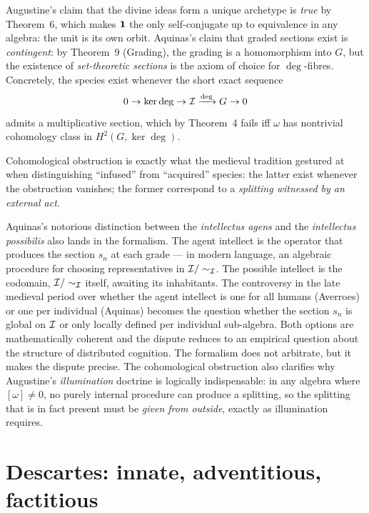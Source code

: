 \formalstatus Augustine's claim that the divine ideas form a unique
archetype is \emph{true} by Theorem~6, which makes $\mathbf{1}$ the only
self-conjugate up to equivalence in any algebra: the unit is its own
orbit. Aquinas's claim that graded sections exist is \emph{contingent}:
by Theorem~9 (Grading), the grading is a homomorphism into $G$, but the
existence of \emph{set-theoretic sections} is the axiom of choice for
$\deg$-fibres. Concretely, the species exist whenever the short exact
sequence
\[
  0 \to \ker\deg \to \mathcal{I} \xrightarrow{\deg} G \to 0
\]
admits a multiplicative section, which by Theorem~4 fails iff
$\omega$ has nontrivial cohomology class in $H^2(G,\ker\deg)$.

\litcomment Cohomological obstruction is exactly what the medieval
tradition gestured at when distinguishing ``infused'' from ``acquired''
species: the latter exist whenever the obstruction vanishes; the former
correspond to a \emph{splitting witnessed by an external act}.

Aquinas's notorious distinction between the \emph{intellectus agens}
and the \emph{intellectus possibilis} also lands in the formalism. The
agent intellect is the operator that produces the section $s_n$ at each
grade --- in modern language, an algebraic procedure for choosing
representatives in $\mathcal{I}/\sim_{\mathcal{I}}$. The possible intellect is the
codomain, $\mathcal{I}/\sim_{\mathcal{I}}$ itself, awaiting its inhabitants. The
controversy in the late medieval period over whether the agent
intellect is one for all humans (Averroes) or one per individual
(Aquinas) becomes the question whether the section $s_n$ is global on
$\mathcal{I}$ or only locally defined per individual sub-algebra. Both
options are mathematically coherent and the dispute reduces to an
empirical question about the structure of distributed cognition. The
formalism does not arbitrate, but it makes the dispute precise. The
cohomological obstruction also clarifies why Augustine's
\emph{illumination} doctrine is logically indispensable: in any algebra
where $[\omega]\neq 0$, no purely internal procedure can produce a
splitting, so the splitting that is in fact present must be \emph{given
from outside}, exactly as illumination requires.

\section{Descartes: innate, adventitious, factitious}\label{sec:descartes}

